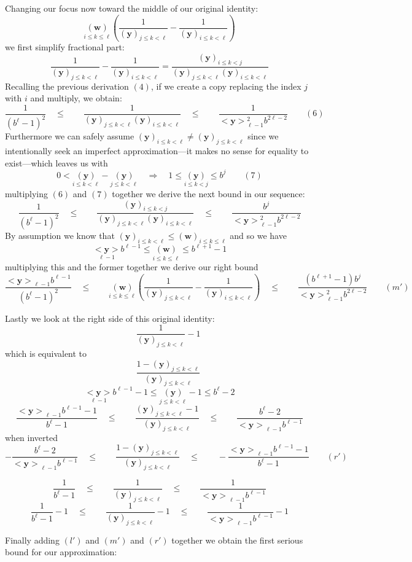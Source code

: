 \documentclass[twoside]{article}
\renewcommand{\leq}{\ensuremath{\quad\le\qquad}}
\newcommand{\bseq}[1][u]{\ensuremath{<\!\!\bm{#1}\!\!>}}
\newcommand{\bunderseq}[2][u]{\ensuremath{\underset{#2}{<\!\!\bm{#1}\!\!>}}}
\newcommand{\bradix}[2][u]{\ensuremath{\underset{#2}{(\bm{#1})}}}
\newcommand{\numer}[3][w]{\ensuremath{(\bm{#1})_{#2\le k\le #3}}}
\newcommand{\denom}[3][y]{\ensuremath{(\bm{#1})_{#2\le k <  #3}}}
\begin{document}
Changing our focus now toward the middle of our original identity:
$$ \bradix[w]{i\le k\le\ell}\left(\frac{1}{\denom{j}{\ell}}-\frac{1}{\denom{i}{\ell}}\right) $$
we first simplify fractional part:
$$ \frac{1}{\denom{j}{\ell}}-\frac{1}{\denom{i}{\ell}}=\frac{\denom{i}{j}}{\denom{j}{\ell}\denom{i}{\ell}} $$
Recalling the previous derivation $ (4) $, if we create a copy replacing the index $ j $ with $ i $ and multiply, we obtain:
$$ \frac{1}{(b^\ell-1)^2}\leq\frac{1}{\denom{j}{\ell}\denom{i}{\ell}}\leq\frac{1}{\bseq[y]_{\ell-1}^2b^{2\ell-2}}\qquad (6) $$
Furthermore we can safely assume $ \denom{i}{\ell}\neq\denom{j}{\ell} $ since we intentionally seek an
imperfect approximation---it makes no sense for equality to exist---which leaves us with
$$ 0 < \bradix[y]{i\le k < \ell}-\bradix[y]{j\le k < \ell}
	\quad\Longrightarrow\quad 1\le\bradix[y]{i\le k < j}\le b^j\qquad (7) $$
multiplying $ (6) $ and $ (7) $ together we derive the next bound in our sequence:
$$ \frac{1}{(b^\ell-1)^2}
	\leq\frac{\denom{i}{j}}{\denom{j}{\ell}\denom{i}{\ell}}
	\leq\frac{b^j}{\bseq[y]_{\ell-1}^2b^{2\ell-2}} $$
By assumption we know that $ \denom{i}{\ell}\le\numer{i}{\ell} $ and so we have
$$ \bunderseq[y]{\ell-1}b^{\ell-1}\le\bradix[w]{i\le k\le\ell}\le b^{\ell+1}-1 $$
multiplying this and the former together we derive our right bound
$$ \frac{\bseq[y]_{\ell-1}b^{\ell-1}}{(b^\ell-1)^2}
	\leq\bradix[w]{i\le k\le\ell}\left(\frac{1}{\denom{j}{\ell}}-\frac{1}{\denom{i}{\ell}}\right)
	\leq\frac{(b^{\ell+1}-1)b^j}{\bseq[y]_{\ell-1}^2b^{2\ell-2}}\qquad (m') $$

Lastly we look at the right side of this original identity:
$$ \qquad\frac{1}{\denom{j}{\ell}}-1 $$
which is equivalent to
$$ \qquad\frac{1-\denom{j}{\ell}}{\denom{j}{\ell}} $$
$$ \bunderseq[y]{\ell-1}b^{\ell-1}-1
	\le\bradix[y]{j\le k < \ell}-1
	\le b^\ell-2 $$
$$ \frac{\bseq[y]_{\ell-1}b^{\ell-1}-1}{b^\ell-1}
	\leq\frac{\denom{j}{\ell}-1}{\denom{j}{\ell}}
	\leq\frac{b^\ell-2}{\bseq[y]_{\ell-1}b^{\ell-1}} $$
when inverted
$$ -\frac{b^\ell-2}{\bseq[y]_{\ell-1}b^{\ell-1}}
	\leq\frac{1-\denom{j}{\ell}}{\denom{j}{\ell}}
	\leq-\frac{\bseq[y]_{\ell-1}b^{\ell-1}-1}{b^\ell-1}\qquad (r') $$

$$ \frac{1}{b^\ell-1}
	\leq\frac{1}{\denom{j}{\ell}}
	\leq\frac{1}{\bseq[y]_{\ell-1}b^{\ell-1}} $$
$$ \frac{1}{b^\ell-1}-1
	\leq\frac{1}{\denom{j}{\ell}}-1
	\leq\frac{1}{\bseq[y]_{\ell-1}b^{\ell-1}}-1 $$

Finally adding $ (l') $ and $ (m') $ and $ (r') $ together we obtain the first serious bound for our approximation:
\end{document}
